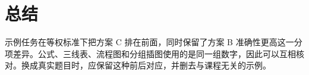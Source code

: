 \section{总结}
\label{sec:conclusion}

示例任务在等权标准下把方案 C 排在前面，同时保留了方案 B 准确性更高这一分项差异。公式、三线表、流程图和分组插图使用的是同一组数字，因此可以互相核对。换成真实题目时，应保留这种前后对应，并删去与课程无关的示例。
